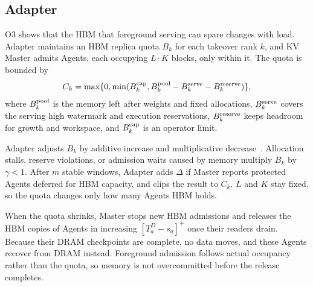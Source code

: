 \subsection{Adapter}
\label{sec:capacity}

O3 shows that the HBM that foreground serving can spare changes with
load. Adapter maintains an HBM replica quota $B_k$ for each takeover rank
$k$, and KV Master admits Agents, each occupying $L\cdot K$ blocks, only
within it. The quota is bounded by
\begin{equation}
 C_k=\max\{0,\min(B^{\rm cap}_k,
 B^{\rm pool}_k-B^{\rm serve}_k-B^{\rm reserve}_k)\},
 \label{eq:ceiling}
\end{equation}
where $B^{\rm pool}_k$ is the memory left after weights and fixed
allocations, $B^{\rm serve}_k$ covers the serving high watermark and
execution reservations, $B^{\rm reserve}_k$ keeps headroom for growth and
workspace, and $B^{\rm cap}_k$ is an operator limit.

Adapter adjusts $B_k$ by additive increase and multiplicative
decrease~\cite{chiu1989aimd}. Allocation stalls, reserve violations, or
admission waits caused by memory multiply $B_k$ by $\gamma<1$. After $m$
stable windows, Adapter adds $\Delta$ if Master reports protected Agents
deferred for HBM capacity, and clips the result to $C_k$. $L$ and $K$ stay
fixed, so the quota changes only how many Agents HBM holds.

When the quota shrinks, Master stops new HBM admissions and releases the
HBM copies of Agents in increasing $[T^{D}_a-s_a]^+$ once their readers
drain. Because their DRAM checkpoints are complete, no data moves, and
these Agents recover from DRAM instead. Foreground admission follows
actual occupancy rather than the quota, so memory is not overcommitted
before the release completes.

